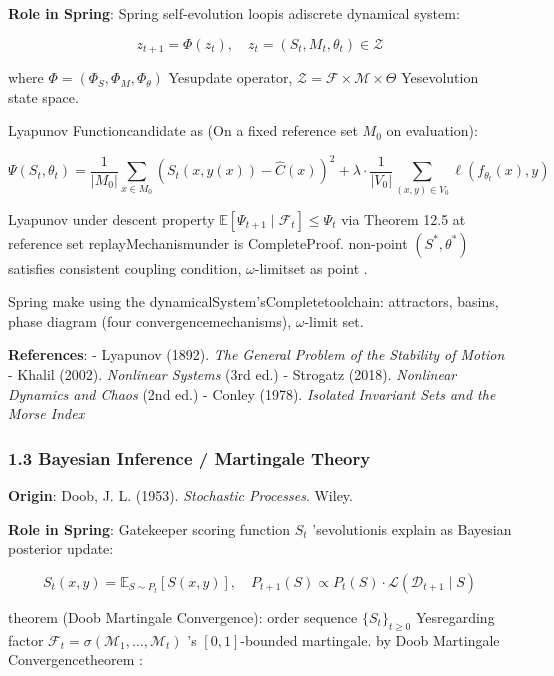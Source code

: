 \documentclass[
  12pt,
]{article}
\begin{document}
\textbf{Role in Spring}: Spring self-evolution loopis adiscrete dynamical system: 

\[z_{t+1} = \Phi(z_t), \quad z_t = (S_t, M_t, \theta_t) \in \mathcal{Z}\]

where \(\Phi = (\Phi_S, \Phi_M, \Phi_\theta)\)
Yesupdate operator, \(\mathcal{Z} = \mathcal{F} \times \mathcal{M} \times \Theta\)
Yesevolution state space. 

Lyapunov Functioncandidate as (On a fixed reference set \(M_0\) on evaluation):

\[\Psi(S_t, \theta_t) = \frac{1}{|M_0|} \sum_{x \in M_0} (S_t(x, y(x)) - \hat{C}(x))^2 + \lambda \cdot \frac{1}{|V_0|} \sum_{(x,y) \in V_0} \ell(f_{\theta_t}(x), y)\]

Lyapunov under descent property
\(\mathbb{E}[\Psi_{t+1} \mid \mathcal{F}_t] \leq \Psi_t\) via  Theorem
12.5 at reference set replayMechanismunder is CompleteProof. non-point  \((S^*, \theta^*)\)
satisfies consistent coupling condition, \(\omega\)-limitset as point . 

Spring
make using the dynamicalSystem'sCompletetoolchain: attractors, basins, phase diagram (four convergencemechanisms), \(\omega\)-limit set.

\textbf{References}: - Lyapunov (1892). \emph{The General Problem of the
Stability of Motion} - Khalil (2002). \emph{Nonlinear Systems} (3rd ed.)
- Strogatz (2018). \emph{Nonlinear Dynamics and Chaos} (2nd ed.) -
Conley (1978). \emph{Isolated Invariant Sets and the Morse Index}

\subsubsection{1.3 Bayesian Inference /
Martingale Theory}\label{ux8d1dux53f6ux65afux63a8ux65ad-ux9785ux7406ux8bba}

\textbf{Origin}: Doob, J. L. (1953). \emph{Stochastic Processes}. Wiley.

\textbf{Role in Spring}: Gatekeeper scoring function \(S_t\)
'sevolutionis explain as Bayesian posterior update: 

\[S_t(x,y) = \mathbb{E}_{S \sim P_t}[S(x,y)], \quad P_{t+1}(S) \propto P_t(S) \cdot \mathcal{L}(\mathcal{D}_{t+1} \mid S)\]

theorem  (Doob Martingale Convergence): order sequence  \(\{S_t\}_{t \geq 0}\) Yesregarding factor 
\(\mathcal{F}_t = \sigma(\mathcal{M}_1, \dots, \mathcal{M}_t)\) 's
\([0,1]\)-bounded martingale. by  Doob Martingale Convergencetheorem : 
\end{document}
